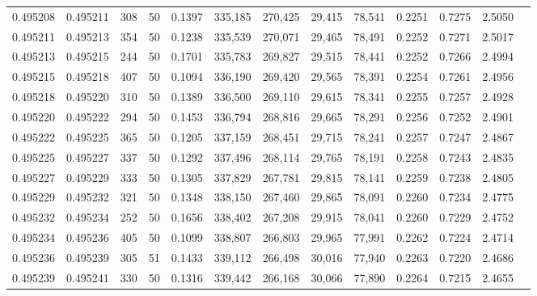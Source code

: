 \begin{tabular}{rrrrrrrrrrrrr}
0.495208 & 0.495211 &   308 &  50 &                                     0.1397 & 335,185 & 270,425 &  29,415 &  78,541 & 0.2251 & 0.7275 & 2.5050 \\
0.495211 & 0.495213 &   354 &  50 &                                     0.1238 & 335,539 & 270,071 &  29,465 &  78,491 & 0.2252 & 0.7271 & 2.5017 \\
0.495213 & 0.495215 &   244 &  50 &                                     0.1701 & 335,783 & 269,827 &  29,515 &  78,441 & 0.2252 & 0.7266 & 2.4994 \\
0.495215 & 0.495218 &   407 &  50 &                                     0.1094 & 336,190 & 269,420 &  29,565 &  78,391 & 0.2254 & 0.7261 & 2.4956 \\
0.495218 & 0.495220 &   310 &  50 &                                     0.1389 & 336,500 & 269,110 &  29,615 &  78,341 & 0.2255 & 0.7257 & 2.4928 \\
0.495220 & 0.495222 &   294 &  50 &                                     0.1453 & 336,794 & 268,816 &  29,665 &  78,291 & 0.2256 & 0.7252 & 2.4901 \\
0.495222 & 0.495225 &   365 &  50 &                                     0.1205 & 337,159 & 268,451 &  29,715 &  78,241 & 0.2257 & 0.7247 & 2.4867 \\
0.495225 & 0.495227 &   337 &  50 &                                     0.1292 & 337,496 & 268,114 &  29,765 &  78,191 & 0.2258 & 0.7243 & 2.4835 \\
0.495227 & 0.495229 &   333 &  50 &                                     0.1305 & 337,829 & 267,781 &  29,815 &  78,141 & 0.2259 & 0.7238 & 2.4805 \\
0.495229 & 0.495232 &   321 &  50 &                                     0.1348 & 338,150 & 267,460 &  29,865 &  78,091 & 0.2260 & 0.7234 & 2.4775 \\
0.495232 & 0.495234 &   252 &  50 &                                     0.1656 & 338,402 & 267,208 &  29,915 &  78,041 & 0.2260 & 0.7229 & 2.4752 \\
0.495234 & 0.495236 &   405 &  50 &                                     0.1099 & 338,807 & 266,803 &  29,965 &  77,991 & 0.2262 & 0.7224 & 2.4714 \\
0.495236 & 0.495239 &   305 &  51 &                                     0.1433 & 339,112 & 266,498 &  30,016 &  77,940 & 0.2263 & 0.7220 & 2.4686 \\
0.495239 & 0.495241 &   330 &  50 &                                     0.1316 & 339,442 & 266,168 &  30,066 &  77,890 & 0.2264 & 0.7215 & 2.4655 \\

\end{tabular}
